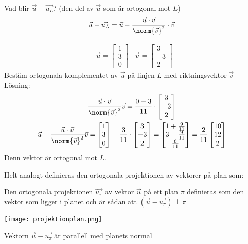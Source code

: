 Vad blir $\vec{u} - \vec{u_L}$? (den del av $\vec{u}$ som är ortogonal mot $L$)
\[
    \vec{u} - \vec{u_L} = \vec{u}-\frac{\vec{u} \cdot \vec{v}}{\norm{\vec{v}}^2} \cdot \vec{v}
\]
\begin{Ex}
	\begin{align*}
    &\vec{u} = \begin{bmatrix} 1\\3\\0 \end{bmatrix} &\vec{v} = \begin{bmatrix} 3\\-3\\2 \end{bmatrix}
    \end{align*}
    Bestäm ortogonala komplementet av $\vec{u}$ på linjen $L$ med riktningsvektor $\vec{v}$\\
    Lösning:
    \begin{gather*}
    	\frac{\vec{u} \cdot \vec{v}}{\norm{\vec{v}}^2} \vec{v} = \frac{0-3}{11} \cdot \begin{bmatrix} 3\\-3\\2 \end{bmatrix} \\
    	\vec{u} - \frac{\vec{u} \cdot \vec{v}}{\norm{\vec{v}}^2} \vec{v} = \begin{bmatrix} 1\\3\\0 \end{bmatrix} + \frac{3}{11} \cdot \begin{bmatrix} 3\\-3\\2 \end{bmatrix} = \begin{bmatrix} 1 + \frac{9}{11}\\3- \frac{9}{11}\\\frac{6}{11}\end{bmatrix} = \frac{2}{11} \begin{bmatrix} 10\\12\\2 \end{bmatrix}
    \end{gather*}
    Denn vektor är ortogonal mot $L$.
\end{Ex}
Helt analogt definieras den ortogonala projektionen av vektorer på plan som:
\begin{Def}
    Den ortogonala projektionen $\vec{u_\pi}$ av vektor $\vec{u}$ på ett plan $\pi$ definieras som den vektor som ligger i planet och är sådan att $(\vec{u} - \vec{u_\pi}) \perp \pi$
    \begin{center}
    	\texttt{[image: projektionplan.png]}
    \end{center}
    \begin{Rem}
        Vektorn $\vec{u} - \vec{u_\pi}$ är parallell med planets normal
    \end{Rem}
\end{Def}

